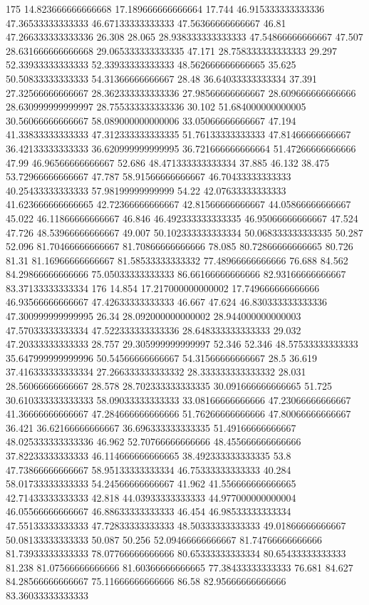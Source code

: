 175 14.823666666666668 17.189666666666664 17.744 46.915333333333336 47.36533333333333 46.67133333333333 47.56366666666667 46.81 47.266333333333336 26.308 28.065 28.938333333333333 47.54866666666667 47.507 28.631666666666668 29.065333333333335 47.171 28.758333333333333 29.297 52.33933333333333 52.33933333333333 48.562666666666665 35.625 50.50833333333333 54.31366666666667 28.48 36.64033333333334 37.391 27.32566666666667 28.362333333333336 27.98566666666667 28.609666666666666 28.630999999999997 28.755333333333336 30.102 51.684000000000005 30.56066666666667 58.089000000000006 33.05066666666667 47.194 41.33833333333333 47.312333333333335 51.76133333333333 47.81466666666667 36.42133333333333 36.620999999999995 36.721666666666664 51.47266666666666 47.99 46.96566666666667 52.686 48.471333333333334 37.885 46.132 38.475 53.72966666666667 47.787 58.91566666666667 46.70433333333333 40.25433333333333 57.98199999999999 54.22 42.07633333333333 41.623666666666665 42.72366666666667 42.81566666666667 44.05866666666667 45.022 46.11866666666667 46.846 46.492333333333335 46.95066666666667 47.524 47.726 48.53966666666667 49.007 50.102333333333334 50.068333333333335 50.287 52.096 81.70466666666667 81.70866666666666 78.085 80.72866666666665 80.726 81.31 81.16966666666667 81.58533333333332 77.48966666666666 76.688 84.562 84.29866666666666 75.05033333333333 86.66166666666666 82.93166666666667 83.37133333333334
176 14.854 17.217000000000002 17.749666666666666 46.93566666666667 47.42633333333333 46.667 47.624 46.830333333333336 47.300999999999995 26.34 28.092000000000002 28.944000000000003 47.57033333333334 47.522333333333336 28.648333333333333 29.032 47.20333333333333 28.757 29.305999999999997 52.346 52.346 48.57533333333333 35.647999999999996 50.54566666666667 54.31566666666667 28.5 36.619 37.416333333333334 27.266333333333332 28.333333333333332 28.031 28.56066666666667 28.578 28.702333333333335 30.091666666666665 51.725 30.610333333333333 58.09033333333333 33.08166666666666 47.23066666666667 41.36666666666667 47.284666666666666 51.76266666666666 47.80066666666667 36.421 36.62166666666667 36.696333333333335 51.49166666666667 48.025333333333336 46.962 52.70766666666666 48.455666666666666 37.82233333333333 46.114666666666665 38.492333333333335 53.8 47.73866666666667 58.95133333333334 46.75333333333333 40.284 58.01733333333333 54.24566666666667 41.962 41.556666666666665 42.71433333333333 42.818 44.03933333333333 44.977000000000004 46.05566666666667 46.88633333333333 46.454 46.98533333333334 47.55133333333333 47.72833333333333 48.50333333333333 49.01866666666667 50.08133333333333 50.087 50.256 52.09466666666667 81.74766666666666 81.73933333333333 78.07766666666666 80.65333333333334 80.65433333333333 81.238 81.07566666666666 81.60366666666665 77.38433333333333 76.681 84.627 84.28566666666667 75.11666666666666 86.58 82.95666666666666 83.36033333333333
